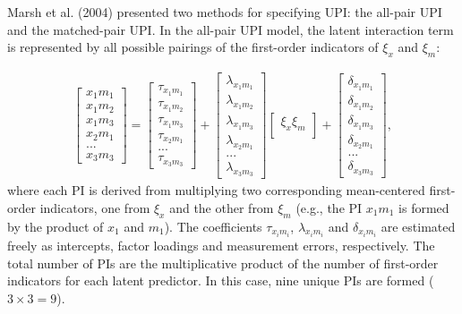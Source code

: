 \documentclass[
  man]{apa6}
\begin{document}
Marsh et al. (2004) presented two methods for specifying UPI: the all-pair UPI and the matched-pair UPI. In the all-pair UPI model, the latent interaction term is represented by all possible pairings of the first-order indicators of \(\xi_{x}\) and \(\xi_{m}\):

\begin{align}
    \begin{bmatrix}
        x_{1}m_{1} \\
        x_{1}m_{2} \\
        x_{1}m_{3} \\ 
        x_{2}m_{1} \\
        ... \\
        x_{3}m_{3}
    \end{bmatrix} = 
    \begin{bmatrix}
        \tau_{x_{1}m_{1}} \\
        \tau_{x_{1}m_{2}} \\ 
        \tau_{x_{1}m_{3}} \\ 
        \tau_{x_{2}m_{1}} \\ 
        ...\\
        \tau_{x_{3}m_{3}} 
    \end{bmatrix} +
    \begin{bmatrix}
        \lambda_{x_{1}m_{1}} \\
        \lambda_{x_{1}m_{2}} \\ 
        \lambda_{x_{1}m_{3}} \\ 
        \lambda_{x_{2}m_{1}} \\ 
        ...\\
        \lambda_{x_{3}m_{3}}
    \end{bmatrix}
    \begin{bmatrix}
        \xi_{x}\xi_{m} \\
    \end{bmatrix} +
    \begin{bmatrix}
        \delta_{x_{1}m_{1}} \\
        \delta_{x_{1}m_{2}} \\ 
        \delta_{x_{1}m_{3}} \\
        \delta_{x_{2}m_{1}} \\
        ... \\
        \delta_{x_{3}m_{3}}
    \end{bmatrix},
\end{align}
where each PI is derived from multiplying two corresponding mean-centered first-order indicators, one from \(\xi_{x}\) and the other from \(\xi_{m}\) (e.g., the PI \(x_{1}m_{1}\) is formed by the product of \(x_{1}\) and \(m_{1}\)). The coefficients \({\tau_{x_{i}m_{i}}}\), \({\lambda_{x_{i}m_{i}}}\) and \({\delta_{x_{i}m_{i}}}\) are estimated freely as intercepts, factor loadings and measurement errors, respectively. The total number of PIs are the multiplicative product of the number of first-order indicators for each latent predictor. In this case, nine unique PIs are formed (\(3 \times 3 = 9\)).
\end{document}
